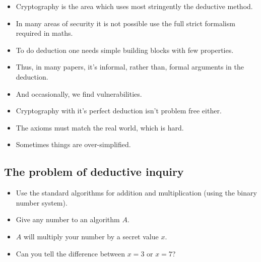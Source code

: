 \begin{frame}
  \begin{remark}
    \begin{itemize}
      \item Cryptography is the area which uses most stringently the deductive 
        method.
      \item In many areas of security it is not possible use the full strict 
        formalism required in maths.
      \item To do deduction one needs simple building blocks with few 
        properties.
      \item Thus, in many papers, it's informal, rather than, formal arguments 
        in the deduction.
      \item And occasionally, we find vulnerabilities.
    \end{itemize}
  \end{remark}
\end{frame}

\begin{frame}
  \begin{remark}
    \begin{itemize}
      \item Cryptography with it's perfect deduction isn't problem free either.
      \item The axioms must match the real world, which is hard.
      \item Sometimes things are over-simplified.
    \end{itemize}
  \end{remark}
\end{frame}

\subsection{The problem of deductive inquiry}

\begin{frame}
  \begin{example}
    \begin{itemize}
      \item Use the standard algorithms for addition and multiplication (using 
        the binary number system).
      \item Give any number to an algorithm \(A\).
      \item \(A\) will multiply your number by a secret value \(x\).
      \item Can you tell the difference between \(x = 3\) or \(x = 7\)?
    \end{itemize}
  \end{example}
\end{frame}

